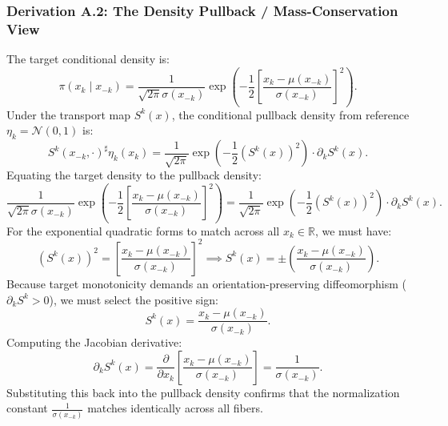 \documentclass[11pt,a4paper]{article}
\theoremstyle{plain}
\theoremstyle{definition}
\theoremstyle{remark}
\begin{document}
\subsubsection{Derivation A.2: The Density Pullback / Mass-Conservation View}
The target conditional density is:
\begin{equation}
    \pi(x_k \mid x_{-k}) = \frac{1}{\sqrt{2\pi}\sigma(x_{-k})} \exp\left( -\frac{1}{2} \left[ \frac{x_k - \mu(x_{-k})}{\sigma(x_{-k})} \right]^2 \right).
\end{equation}
Under the transport map $S^k(x)$, the conditional pullback density from reference $\eta_k = \mathcal{N}(0, 1)$ is:
\begin{equation}
    S^k(x_{-k}, \cdot)^\sharp \eta_k(x_k) = \frac{1}{\sqrt{2\pi}} \exp\left( -\frac{1}{2} \left(S^k(x)\right)^2 \right) \cdot \partial_k S^k(x).
\end{equation}
Equating the target density to the pullback density:
\begin{equation}
    \frac{1}{\sqrt{2\pi}\sigma(x_{-k})} \exp\left( -\frac{1}{2} \left[ \frac{x_k - \mu(x_{-k})}{\sigma(x_{-k})} \right]^2 \right) = \frac{1}{\sqrt{2\pi}} \exp\left( -\frac{1}{2} \left(S^k(x)\right)^2 \right) \cdot \partial_k S^k(x).
\end{equation}
For the exponential quadratic forms to match across all $x_k \in \mathbb{R}$, we must have:
\begin{equation}
    \left(S^k(x)\right)^2 = \left[ \frac{x_k - \mu(x_{-k})}{\sigma(x_{-k})} \right]^2 \implies S^k(x) = \pm \left( \frac{x_k - \mu(x_{-k})}{\sigma(x_{-k})} \right).
\end{equation}
Because target monotonicity demands an orientation-preserving diffeomorphism ($\partial_k S^k > 0$), we must select the positive sign:
\begin{equation}
    S^k(x) = \frac{x_k - \mu(x_{-k})}{\sigma(x_{-k})}.
\end{equation}
Computing the Jacobian derivative:
\begin{equation}
    \partial_k S^k(x) = \frac{\partial}{\partial x_k}\left[ \frac{x_k - \mu(x_{-k})}{\sigma(x_{-k})} \right] = \frac{1}{\sigma(x_{-k})}.
\end{equation}
Substituting this back into the pullback density confirms that the normalization constant $\frac{1}{\sigma(x_{-k})}$ matches identically across all fibers.
\end{document}
